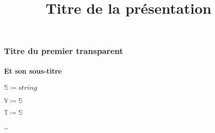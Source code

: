 \documentclass{beamer}
\begin{document}
\title{Titre de la présentation}
\maketitle

\begin{frame} %
\frametitle{Titre du premier transparent}
\framesubtitle{Et son sous-titre}

$\mathbb{S} \coloneqq string$

$\mathbb{V} \coloneqq \mathbb{S}$

$\mathbb{T} \coloneqq \mathbb{S}$

\end{frame}

\begin{frame} %
…
\end{frame}
\end{document}

